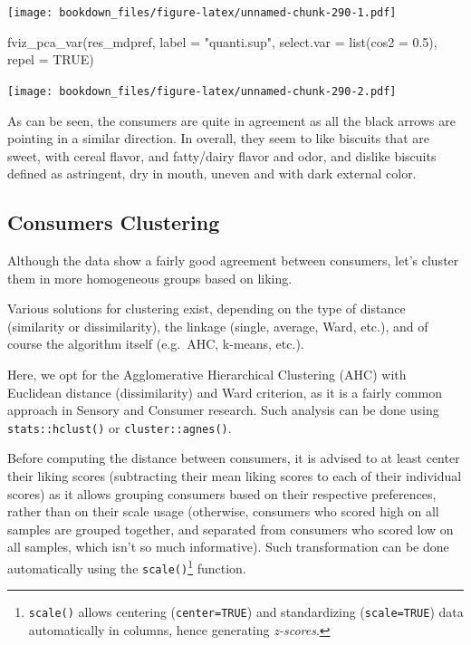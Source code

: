 \documentclass[
]{krantz}
\makeatletter
\newenvironment{Shaded}{\begin{snugshade}}{\end{snugshade}}
\newcommand{\AttributeTok}[1]{\textcolor[rgb]{0.61,0.61,0.61}{#1}}
\newcommand{\ConstantTok}[1]{\textcolor[rgb]{0,0,0}{#1}}
\newcommand{\FloatTok}[1]{\textcolor[rgb]{0.06,0.06,0.06}{#1}}
\newcommand{\FunctionTok}[1]{\textcolor[rgb]{0,0,0}{#1}}
\newcommand{\NormalTok}[1]{#1}
\newcommand{\StringTok}[1]{\textcolor[rgb]{0.5,0.5,0.5}{#1}}
\renewenvironment{quote}{\begin{VF}}{\end{VF}}
\newenvironment{kframe}{%
\medskip{}
\setlength{\fboxsep}{.8em}
 \def\at@end@of@kframe{}%
 \ifinner\ifhmode%
  \def\at@end@of@kframe{\end{minipage}}%
  \begin{minipage}{\columnwidth}%
 \fi\fi%
 \def\FrameCommand##1{\hskip\@totalleftmargin \hskip-\fboxsep
 \colorbox{shadecolor}{##1}\hskip-\fboxsep
     \hskip-\linewidth \hskip-\@totalleftmargin \hskip\columnwidth}%
 \MakeFramed {\advance\hsize-\width
   \@totalleftmargin\z@ \linewidth\hsize
   \@setminipage}}%
 {\par\unskip\endMakeFramed%
 \at@end@of@kframe}
\renewenvironment{Shaded}{\begin{kframe}}{\end{kframe}}
\makeatother
\begin{document}
\texttt{[image: bookdown\_files/figure-latex/unnamed-chunk-290-1.pdf]}

\begin{Shaded}
\begin{Highlighting}[]
\FunctionTok{fviz\_pca\_var}\NormalTok{(res\_mdpref, }\AttributeTok{label =} \StringTok{"quanti.sup"}\NormalTok{, }
             \AttributeTok{select.var =} \FunctionTok{list}\NormalTok{(}\AttributeTok{cos2 =} \FloatTok{0.5}\NormalTok{), }\AttributeTok{repel =} \ConstantTok{TRUE}\NormalTok{)}
\end{Highlighting}
\end{Shaded}

\texttt{[image: bookdown\_files/figure-latex/unnamed-chunk-290-2.pdf]}

As can be seen, the consumers are quite in agreement as all the black arrows are pointing in a similar direction.
In overall, they seem to like biscuits that are sweet, with cereal flavor, and fatty/dairy flavor and odor, and dislike biscuits defined as astringent, dry in mouth, uneven and with dark external color.

\hypertarget{hac}{%
\subsection{Consumers Clustering}\label{hac}}

Although the data show a fairly good agreement between consumers, let's cluster them in more homogeneous groups based on liking.

Various solutions for clustering exist, depending on the type of distance (similarity or dissimilarity), the linkage (single, average, Ward, etc.), and of course the algorithm itself (e.g.~AHC, k-means, etc.).

Here, we opt for the Agglomerative Hierarchical Clustering (AHC) with Euclidean distance (dissimilarity) and Ward criterion, as it is a fairly common approach in Sensory and Consumer research. Such analysis can be done using \texttt{stats::hclust()} or \texttt{cluster::agnes()}.

\begin{quote}
Before computing the distance between consumers, it is advised to at least center their liking scores (subtracting their mean liking scores to each of their individual scores) as it allows grouping consumers based on their respective preferences, rather than on their scale usage (otherwise, consumers who scored high on all samples are grouped together, and separated from consumers who scored low on all samples, which isn't so much informative). Such transformation can be done automatically using the \texttt{scale()}\footnote{\texttt{scale()} allows centering (\texttt{center=TRUE}) and standardizing (\texttt{scale=TRUE}) data automatically in columns, hence generating \emph{z-scores}.} function.
\end{quote}
\end{document}

